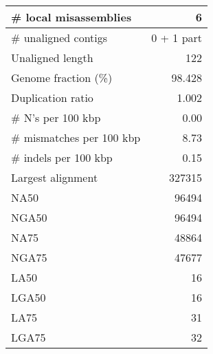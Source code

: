 \documentclass[12pt,a4paper]{article}
\begin{document}
\begin{table}[ht]
\begin{center}
\begin{tabular}{|l*{1}{|r}|}
\# local misassemblies & 6 \\ \hline
\# unaligned contigs & 0 + 1 part \\ \hline
Unaligned length & 122 \\ \hline
Genome fraction (\%) & 98.428 \\ \hline
Duplication ratio & 1.002 \\ \hline
\# N's per 100 kbp & 0.00 \\ \hline
\# mismatches per 100 kbp & 8.73 \\ \hline
\# indels per 100 kbp & 0.15 \\ \hline
Largest alignment & 327315 \\ \hline
NA50 & 96494 \\ \hline
NGA50 & 96494 \\ \hline
NA75 & 48864 \\ \hline
NGA75 & 47677 \\ \hline
LA50 & 16 \\ \hline
LGA50 & 16 \\ \hline
LA75 & 31 \\ \hline
LGA75 & 32 \\ \hline
\end{tabular}
\end{center}
\end{table}
\end{document}
